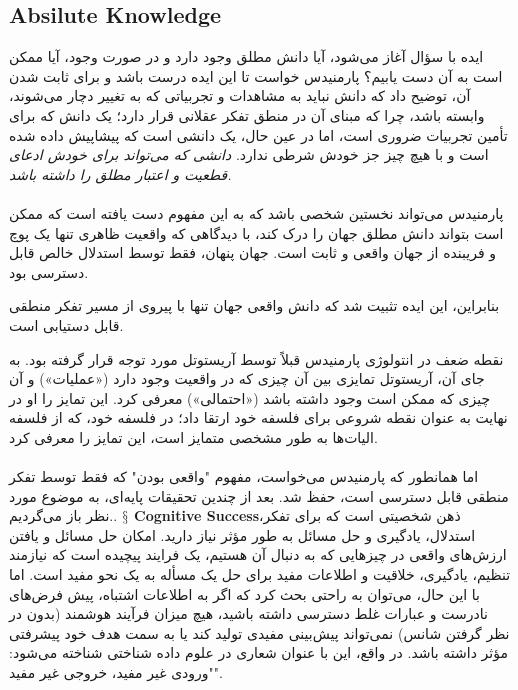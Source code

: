 \documentclass[10pt,a4paper]{article}
\newcommand{\newpoint}[1]{\indent$\mathsection$ \textbf{#1}}
\begin{document}
            \subsection{Absilute Knowledge}ایده با سؤال آغاز می‌شود، آیا دانش مطلق وجود دارد و در صورت وجود، آیا ممکن است به آن دست یابیم؟ پارمنیدس خواست تا این ایده درست باشد و برای ثابت شدن آن، توضیح داد که دانش نباید به مشاهدات و تجربیاتی که به تغییر دچار می‌شوند، وابسته باشد، چرا که مبنای آن در منطق تفکر عقلانی قرار دارد؛ یک دانش که برای تأمین تجربیات ضروری است، اما در عین حال، یک دانشی است که پیشاپیش داده شده است و با هیچ چیز جز خودش شرطی ندارد. \textit{دانشی که می‌تواند برای خودش ادعای قطعیت و اعتبار مطلق را داشته باشد.}
            \\
            \\
           پارمنیدس می‌تواند نخستین شخصی باشد که به این مفهوم دست یافته است که ممکن است بتواند دانش مطلق جهان را درک کند، با دیدگاهی که واقعیت ظاهری تنها یک پوچ و فریبنده از جهان واقعی و ثابت است. جهان پنهان، فقط توسط استدلال خالص قابل دسترسی بود.
            \begin{qt}
               بنابراین، این ایده تثبیت شد که دانش واقعی جهان تنها با پیروی از مسیر تفکر منطقی قابل دستیابی است.
            \end{qt}
            نقطه ضعف در انتولوژی پارمنیدس قبلاً توسط آریستوتل مورد توجه قرار گرفته بود. به جای آن، آریستوتل تمایزی بین آن چیزی که در واقعیت وجود دارد («عملیات») و آن چیزی که ممکن است وجود داشته باشد («احتمالی») معرفی کرد. این تمایز را او در نهایت به عنوان نقطه شروعی برای فلسفه خود ارتقا داد؛ در فلسفه خود، که از فلسفه الیات‌ها به طور مشخصی متمایز است، این تمایز را معرفی کرد.
            \\
            \\
            اما همانطور که پارمنیدس می‌خواست، مفهوم "واقعی بودن" که فقط توسط تفکر منطقی قابل دسترسی است، حفظ شد. بعد از چندین تحقیقات پایه‌ای، به موضوع مورد نظر باز می‌گردیم..\cite{Kuppers2018-vv}
            \newpoint{Cognitive Success}ذهن شخصیتی است که برای تفکر، استدلال، یادگیری و حل مسائل به طور مؤثر نیاز دارید. امکان حل مسائل و یافتن ارزش‌های واقعی در چیزهایی که به دنبال آن هستیم، یک فرایند پیچیده است که نیازمند تنظیم، یادگیری، خلاقیت و اطلاعات مفید برای حل یک مسأله به یک نحو مفید است. اما با این حال، می‌توان به راحتی بحث کرد که اگر به اطلاعات اشتباه، پیش فرض‌های نادرست و عبارات غلط دسترسی داشته باشید، هیچ میزان فرآیند هوشمند (بدون در نظر گرفتن شانس) نمی‌تواند پیش‌بینی مفیدی تولید کند یا به سمت هدف خود پیشرفتی مؤثر داشته باشد. در واقع، این با عنوان شعاری در علوم داده شناختی شناخته می‌شود: "ورودی غیر مفید، خروجی غیر مفید".\cite{sep-epistemology}\cite{Clegg2017-ev}
\end{document}
